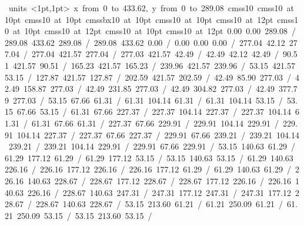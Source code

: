\hbox{\beginpicture
\setcoordinatesystem units <1pt,1pt>
\setplotarea x from 0 to 433.62, y from 0 to 289.08
\setlinear
\font\picfont cmss10\picfont
\font\picfont cmss10 at 10pt\picfont
\font\picfont cmss10 at 10pt\picfont
\font\picfont cmssbx10 at 10pt\picfont
\font\picfont cmss10 at 10pt\picfont
\font\picfont cmss10 at 12pt\picfont
\font\picfont cmss10 at 10pt\picfont
\font\picfont cmss10 at 12pt\picfont
\font\picfont cmss10 at 10pt\picfont
\font\picfont cmss10 at 12pt\picfont
\setsolid
{} 0.00 0.00 289.08 /
 289.08 433.62 289.08 /
 289.08 433.62 0.00 /
 0.00 0.00 0.00 /
\setsolid
{} 277.04 42.12 277.04 /
 277.04 421.57 277.04 /
 277.03 421.57 42.49 /
 42.49 42.12 42.49 /
\setsolid
{} 90.51 421.57 90.51 /
\setsolid
{} 165.23 421.57 165.23 /
\setsolid
{} 239.96 421.57 239.96 /
\setsolid
{} 53.15 421.57 53.15 /
\setsolid
{} 127.87 421.57 127.87 /
\setsolid
{} 202.59 421.57 202.59 /
\setsolid
{} 42.49 85.90 277.03 /
\setsolid
{} 42.49 158.87 277.03 /
\setsolid
{} 42.49 231.85 277.03 /
\setsolid
{} 42.49 304.82 277.03 /
\setsolid
{} 42.49 377.79 277.03 /
\setsolid
{} 53.15 67.66 61.31 /
 61.31 104.14 61.31 /
 61.31 104.14 53.15 /
 53.15 67.66 53.15 /
\setsolid
{} 61.31 67.66 227.37 /
 227.37 104.14 227.37 /
 227.37 104.14 61.31 /
 61.31 67.66 61.31 /
\setsolid
{} 227.37 67.66 229.91 /
 229.91 104.14 229.91 /
 229.91 104.14 227.37 /
 227.37 67.66 227.37 /
\setsolid
{} 229.91 67.66 239.21 /
 239.21 104.14 239.21 /
 239.21 104.14 229.91 /
 229.91 67.66 229.91 /
\setsolid
{} 53.15 140.63 61.29 /
 61.29 177.12 61.29 /
 61.29 177.12 53.15 /
 53.15 140.63 53.15 /
\setsolid
{} 61.29 140.63 226.16 /
 226.16 177.12 226.16 /
 226.16 177.12 61.29 /
 61.29 140.63 61.29 /
\setsolid
{} 226.16 140.63 228.67 /
 228.67 177.12 228.67 /
 228.67 177.12 226.16 /
 226.16 140.63 226.16 /
\setsolid
{} 228.67 140.63 247.31 /
 247.31 177.12 247.31 /
 247.31 177.12 228.67 /
 228.67 140.63 228.67 /
\setsolid
{} 53.15 213.60 61.21 /
 61.21 250.09 61.21 /
 61.21 250.09 53.15 /
 53.15 213.60 53.15 /
\setsolid
}
